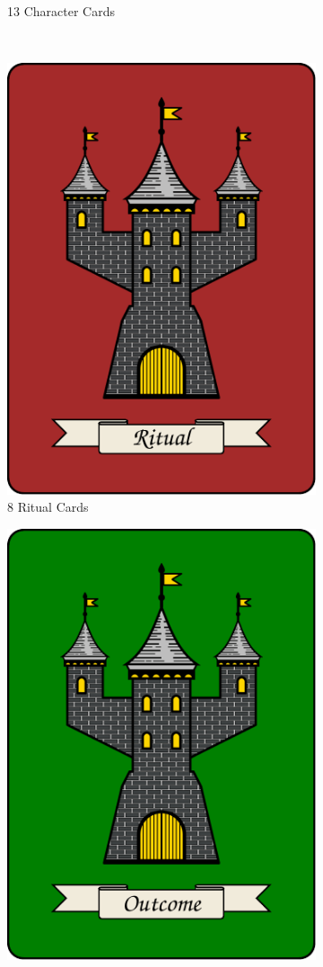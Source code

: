 \documentclass[10pt, parskip=half-, twoside]{scrartcl}
\begin{document}
\begin{itemize}[itemindent=*, leftmargin=*]
\begin{figure}[H]
\begin{subfigure}{0.4\textwidth}
	\caption*{13 Character Cards}
	\end{subfigure}
	\\[1em]
	\begin{subfigure}{0.4\textwidth}
	\centering
		\includegraphics[scale=0.1]{Images/ritual_card_back.pdf}
	\caption*{8 Ritual Cards}
	\end{subfigure}
	\qquad
	\begin{subfigure}{0.4\textwidth}
	\centering
		\includegraphics[scale=0.1]{Images/outcome_card_back.pdf}

\end{subfigure}
\end{figure}
\end{itemize}
\end{document}

